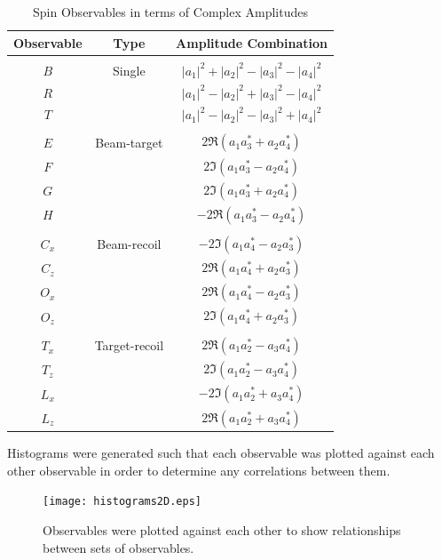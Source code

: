 \documentclass[a4paper,12pt]{article}
\begin{document}
  \begin{center}
  \begin{table}[!h]
  \caption{Spin Observables in terms of Complex Amplitudes\cite{info}}
  \centering
  \begin{tabular}{c  c  c}
  \hline \hline
  Observable & Type & Amplitude Combination \\ [0.5ex]
  \hline \\
  $B$ & Single & $|a_{1}|^{2} + |a_{2}|^{2} - |a_{3}|^{2} - |a_{4}|^{2}$ \\
  $R$ & & $|a_{1}|^{2} - |a_{2}|^{2} + |a_{3}|^{2} - |a_{4}|^{2}$ \\
  $T$ & & $|a_{1}|^{2} - |a_{2}|^{2} - |a_{3}|^{2} + |a_{4}|^{2}$ \\ \\
  $E$ & Beam-target & $2\Re(a_{1}a_{3}^{*} + a_{2}a_{4}^{*})$ \\
  $F$ & & $2\Im(a_{1}a_{3}^{*} - a_{2}a_{4}^{*})$ \\ 
  $G$ & & $2\Im(a_{1}a_{3}^{*} + a_{2}a_{4}^{*})$ \\ 
  $H$ & & $-2\Re(a_{1}a_{3}^{*} - a_{2}a_{4}^{*})$ \\ \\
  $C_{x}$ & Beam-recoil & $-2\Im(a_{1}a_{4}^{*} - a_{2}a_{3}^{*})$ \\
  $C_{z}$ & & $2\Re(a_{1}a_{4}^{*} + a_{2}a_{3}^{*})$ \\
  $O_{x}$ & & $2\Re(a_{1}a_{4}^{*} - a_{2}a_{3}^{*})$ \\
  $O_{z}$ & & $2\Im(a_{1}a_{4}^{*} + a_{2}a_{3}^{*})$ \\ \\
  $T_{x}$ & Target-recoil & $2\Re(a_{1}a_{2}^{*} - a_{3}a_{4}^{*})$ \\
  $T_{z}$ & & $2\Im(a_{1}a_{2}^{*} - a_{3}a_{4}^{*})$ \\
  $L_{x}$ & & $-2\Im(a_{1}a_{2}^{*} + a_{3}a_{4}^{*})$ \\
  $L_{z}$ & & $2\Re(a_{1}a_{2}^{*} + a_{3}a_{4}^{*})$ \\ [1ex]
  \hline
  \end{tabular}

  \end{table}
  \end{center}

Histograms were generated such that each observable was plotted against each other observable in order to determine any correlations between them.  

\begin{figure}[!h]
 \begin{center}
  \texttt{[image: histograms2D.eps]}
  \caption{Observables were plotted against each other to show relationships between sets of observables.}
 \end{center}
\end{figure}
\end{document}
